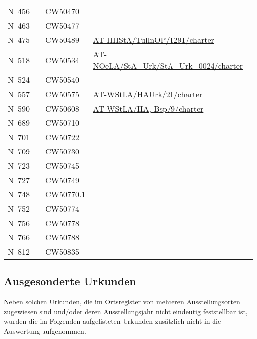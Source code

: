 \begin{xltabular}{\linewidth}{@{} l c l X @{}}
N~456	&           & CW50470 \\
N~463	&           & CW50477 \\
N~475	&           & CW50489
	& \url{AT-HHStA/TullnOP/1291/charter}
	\\
N~518	&           & CW50534
	& \url{AT-NOeLA/StA_Urk/StA_Urk_0024/charter}
	\\
N~524	&           & CW50540 \\
N~557	&           & CW50575
		& \url{AT-WStLA/HAUrk/21/charter}
	\\
N~590	&           & CW50608
		& \url{AT-WStLA/HA, Bsp/9/charter}
	\\
N~689	&           & CW50710 \\
N~701	&           & CW50722 \\
N~709	&           & CW50730 \\
N~723	&           & CW50745 \\
N~727	&           & CW50749 \\
N~748	&           & CW50770.1 \\
N~752	&           & CW50774 \\
N~756	&           & CW50778 \\
N~766	&           & CW50788 \\
N~812	&           & CW50835 \\
\end{xltabular}

\subsection{Ausgesonderte Urkunden}
\label{subsec:ausgesurk}

Neben solchen Urkunden, die im Ortsregister von \citet{cao-online} mehreren
Ausstellungsorten zugewiesen sind und/oder deren Ausstellungsjahr nicht
eindeutig feststellbar ist, wurden die im Folgenden aufgelisteten Urkunden
zusätzlich nicht in die Auswertung aufgenommen.

